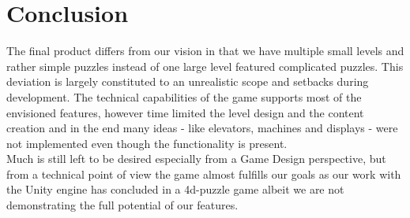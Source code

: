 \section{Conclusion}
The final product differs from our vision in that we have multiple small levels and rather simple puzzles instead of one large level featured complicated puzzles. This deviation is largely constituted to an unrealistic scope and setbacks during development. The technical capabilities of the game supports most of the envisioned features, however time limited the level design and the content creation and in the end many ideas - like elevators, machines and displays - were not implemented even though the functionality is present.\\

Much is still left to be desired especially from a Game Design perspective, but from a technical point of view the game almost fulfills our goals as our work with the Unity engine has concluded in a 4d-puzzle game albeit we are not demonstrating the full potential of our features.
 